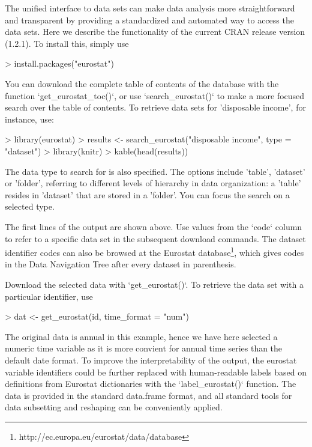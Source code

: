 The unified interface to data sets can make data analysis more
straightforward and transparent by providing a standardized and
automated way to access the data sets. Here we describe the
functionality of the current CRAN release version (1.2.1). To install
this, simply use

\begin{Schunk}
\begin{Sinput}
> install.packages("eurostat")
\end{Sinput}
\end{Schunk}

You can download the complete table of contents of the database with the function `get\_eurostat\_toc()`, or use `search\_eurostat()` to make a more focused search over the table of contents. To retrieve data sets for 'disposable income', for instance, use:


\begin{Schunk}
\begin{Sinput}
> library(eurostat)
> results <- search_eurostat("disposable income", type = "dataset")
> library(knitr)
> kable(head(results))
\end{Sinput}
\end{Schunk}

The data type to search for is also specified. The options include 'table', 'dataset' or 'folder', referring to different levels of hierarchy in data organization: a 'table' resides in 'dataset' that are stored in a 'folder'. You can focus the search on a selected type.

The first lines of the output are shown above. Use values from the `code` column to refer to a specific data set in the subsequent download commands. The dataset identifier codes can also be browsed at the Eurostat
database\footnote{http://ec.europa.eu/eurostat/data/database}, which gives
codes in the Data Navigation Tree after every dataset in parenthesis.

Download the selected data with `get\_eurostat()`. To retrieve the data set with a particular identifier, use 

\begin{Schunk}
\begin{Sinput}
> dat <- get_eurostat(id, time_format = "num")
\end{Sinput}
\end{Schunk}

The original data is annual in this example, hence we have here
selected a numeric time variable as it is more convient for annual
time series than the default date format. To improve the
interpretability of the output, the eurostat variable identifiers
could be further replaced with human-readable labels based on
definitions from Eurostat dictionaries with the `label\_eurostat()`
function. The data is provided in the standard data.frame format, and
all standard tools for data subsetting and reshaping can be
conveniently applied.

